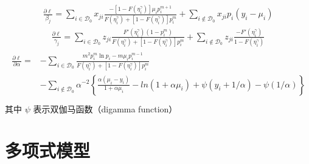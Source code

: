 \documentclass[letterpaper,10pt,english]{sphinxmanual}
\begin{document}
\begin{equation}\label{equation:零计数问题/content:零计数问题/content:6}
\begin{split}\frac{\partial \ell}{\beta_j} =
\sum_{ i \in \mathcal{D}_0 } x_{ji}
\frac{-[ 1- F(\eta^{\gamma}_i)] \mu_i p_i^{m+1}}
{F(\eta^{\gamma}_i) + [ 1- F(\eta^{\gamma}_i)] p_i^m}
+ \sum_{ i \notin \mathcal{D}_0 }
x_{ji}p_i(y_i-\mu_i)\end{split}
\end{equation}\begin{equation}\label{equation:零计数问题/content:零计数问题/content:7}
\begin{split}\frac{\partial \ell}{\gamma_j} =
\sum_{ i \in \mathcal{D}_0 } z_{ji}
\frac{F'(\eta^{\gamma}_i)(1-p_i^m)}
{F(\eta^{\gamma}_i)+[ 1- F(\eta^{\gamma}_i)]p_i^m}
+ \sum_{ i \notin \mathcal{D}_0 } z_{ji}
\frac{-F'(\eta^{\gamma}_i)}{1-F(\eta^{\gamma}_i)}\end{split}
\end{equation}\begin{align}\label{equation:零计数问题/content:零计数问题/content:8}\!\begin{aligned}
\frac{\partial \ell}{\partial \alpha} = &-
\sum_{ i \in \mathcal{D}_0 }
\frac{m^2p_i^m \ln p_i -m\mu_i p_i^{m-1}}
{F(\eta^{\gamma}_i) + [1-F(\eta^{\gamma}_i)] p_i^m}\\
&- \sum_{ i \notin \mathcal{D}_0 } \alpha^{-2}
\left \{
\frac{\alpha(\mu_i-y_i)}{1+\alpha \mu_i}
-ln(1+\alpha \mu_i)
+ \psi(y_i + 1/\alpha) - \psi(1/\alpha)
\right \}\\
\end{aligned}\end{align}
其中 \(\psi\) 表示双伽马函数（digamma function）


\chapter{多项式模型}
\label{\detokenize{_u65e0_u5e8f_u79bb_u6563_u6a21_u578b/content:id1}}\label{\detokenize{_u65e0_u5e8f_u79bb_u6563_u6a21_u578b/content::doc}}


\end{document}
